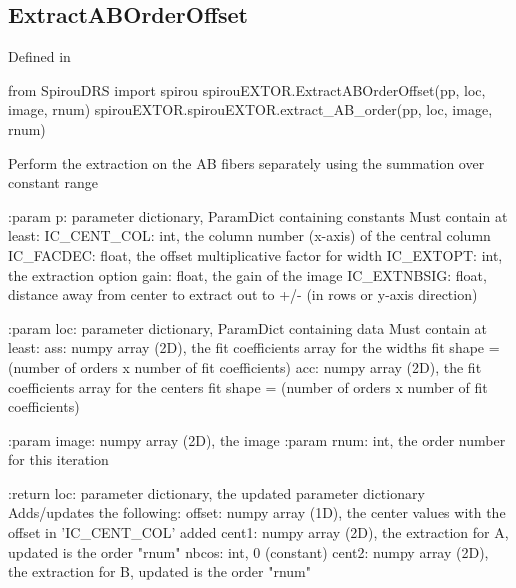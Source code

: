 \begin{minipage}{\textwidth}
\subsection{ExtractABOrderOffset}

Defined in \spirouEXTOR{}

\begin{pythonbox}
from SpirouDRS import spirou
spirouEXTOR.ExtractABOrderOffset(pp, loc, image, rnum)
spirouEXTOR.spirouEXTOR.extract_AB_order(pp, loc, image, rnum)
\end{pythonbox}

\begin{pythondocstring}
Perform the extraction on the AB fibers separately using the summation
over constant range

:param p: parameter dictionary, ParamDict containing constants
    Must contain at least:
            IC_CENT_COL: int, the column number (x-axis) of the central
                         column
            IC_FACDEC: float, the offset multiplicative factor for width
            IC_EXTOPT: int, the extraction option
            gain: float, the gain of the image
            IC_EXTNBSIG: float, distance away from center to extract
                         out to +/- (in rows or y-axis direction)

:param loc: parameter dictionary, ParamDict containing data
        Must contain at least:
            ass: numpy array (2D), the fit coefficients array for
                  the widths fit
                  shape = (number of orders x number of fit coefficients)
            acc: numpy array (2D), the fit coefficients array for
                  the centers fit
                  shape = (number of orders x number of fit coefficients)


:param image: numpy array (2D), the image
:param rnum: int, the order number for this iteration

:return loc: parameter dictionary, the updated parameter dictionary
        Adds/updates the following:
            offset: numpy array (1D), the center values with the
                    offset in 'IC_CENT_COL' added
            cent1: numpy array (2D), the extraction for A, updated is
                   the order "rnum"
            nbcos: int, 0 (constant)
            cent2: numpy array (2D), the extraction for B, updated is
                   the order "rnum"
\end{pythondocstring}
\end{minipage}

